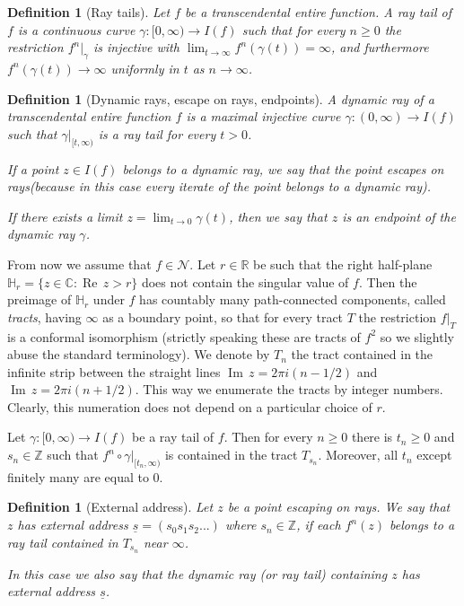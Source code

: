 \documentclass[10pt,reqno,a4paper]{amsart}
\numberwithin{figure}{section}
\numberwithin{equation}{section}
\newtheorem{defn}[thm]{Definition}
\renewcommand{\Re}{\operatorname{Re\,}}
\renewcommand{\Im}{\operatorname{Im\,}}
\begin{document}
\begin{defn}[Ray tails]
	\label{dfn:ray_tail}
	Let $f$ be a transcendental entire function. A \emph{ray tail} of $f$ is a continuous curve $\gamma:[0,\infty)\to I(f)$ such that for every $n\geq 0$ the restriction $f^n|_\gamma$ is injective with $\lim_{t\to\infty}f^n(\gamma(t))=\infty$, and furthermore $f^n(\gamma(t))\to\infty$ uniformly in $t$ as $n\to\infty$.
\end{defn}

\begin{defn}[Dynamic rays, escape on rays, endpoints]
	\label{dfn:dynamic_ray}
	A \emph{dynamic ray} of a transcendental entire function $f$ is a maximal injective curve $\gamma:(0,\infty)\to I(f)$ such that $\gamma|_{[t,\infty)}$ is a ray tail for every $t>0$.
	
	If a point $z\in I(f)$ belongs to a dynamic ray, we say that the point \emph{escapes on rays}(because in this case every iterate of the point belongs to a dynamic ray). 
	
	If there exists a limit $z=\lim_{t\to 0}\gamma(t)$, then we say that $z$ is an \emph{endpoint of the dynamic ray} $\gamma$.  
\end{defn}

From now we assume that $f\in\mathcal{N}$. Let $r\in\mathbb{R}$ be such that the right half-plane $\mathbb{H}_r=\{z\in\mathbb{C}:\Re z>r\}$ does not contain the singular value of $f$. Then the preimage of $\mathbb{H}_r$ under $f$ has countably many path-connected components, called \emph{tracts}, having $\infty$ as a boundary point, so that for every tract $T$ the restriction $f|_T$ is a conformal isomorphism (strictly speaking these are tracts of $f^2$ so we slightly abuse the standard terminology). We denote by $T_n$ the tract contained in the infinite strip between the straight lines $\Im z=2\pi i(n-1/2)$ and $\Im z=2\pi i(n+1/2)$. This way we enumerate the tracts by integer numbers. Clearly, this numeration does not depend on a particular choice of $r$.

Let $\gamma:[0,\infty)\to I(f)$ be a ray tail of $f$. Then for every $n\geq 0$ there is $t_n\geq 0$ and $s_n\in\mathbb{Z}$ such that $f^n\circ\gamma|_{[t_n,\infty)}$ is contained in the tract $T_{s_n}$. Moreover, all $t_n$ except finitely many are equal to $0$.

\begin{defn}[External address]
	Let $z$ be a point escaping on rays. We say that $z$ has \emph{external address} $\underline{s}=(s_0 s_1 s_2 ... )$ where $s_n\in\mathbb{Z}$, if each $f^n(z)$ belongs to a ray tail contained in $T_{s_n}$ near $\infty$.
	
	In this case we also say that the dynamic ray (or ray tail) containing $z$ has external address $\underline{s}$. 
\end{defn}
\end{document}
